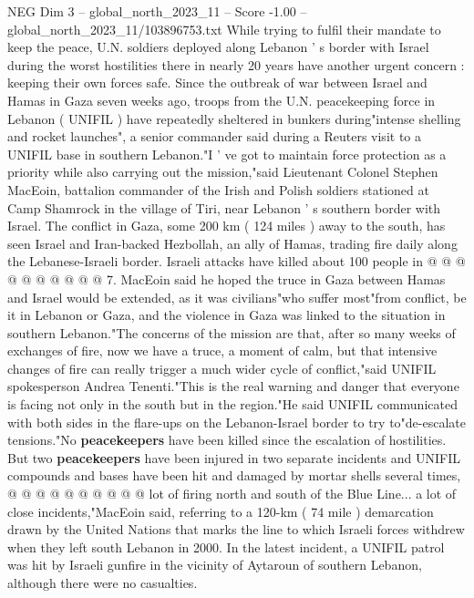 \begin{textsample}{NEG Dim 3 – global\_north\_2023\_11 – Score -1.00 – global\_north\_2023\_11/103896753.txt}  \label{ex:f3_neg_271}
While trying to fulfil their mandate to keep the peace, U.N. soldiers deployed along Lebanon ' s border with Israel during the worst hostilities there in nearly 20 years have another urgent concern : keeping their own forces safe.
Since the outbreak of war between Israel and Hamas in Gaza seven weeks ago, troops from the U.N. peacekeeping force in Lebanon ( UNIFIL ) have repeatedly sheltered in bunkers during"intense shelling and rocket launches", a senior commander said during a Reuters visit to a UNIFIL base in southern Lebanon."I ' ve got to maintain force protection as a priority while also carrying out the mission,"said Lieutenant Colonel Stephen MacEoin, battalion commander of the Irish and Polish soldiers stationed at Camp Shamrock in the village of Tiri, near Lebanon ' s southern border with Israel.
The conflict in Gaza, some 200 km ( 124 miles ) away to the south, has seen Israel and Iran-backed Hezbollah, an ally of Hamas, trading fire daily along the Lebanese-Israeli border.
Israeli attacks have killed about 100 people in @ @ @ @ @ @ @ @ @ @ 7.
MacEoin said he hoped the truce in Gaza between Hamas and Israel would be extended, as it was civilians"who suffer most"from conflict, be it in Lebanon or Gaza, and the violence in Gaza was linked to the situation in southern Lebanon."The concerns of the mission are that, after so many weeks of exchanges of fire, now we have a truce, a moment of calm, but that intensive changes of fire can really trigger a much wider cycle of conflict,"said UNIFIL spokesperson Andrea Tenenti."This is the real warning and danger that everyone is facing not only in the south but in the region."He said UNIFIL communicated with both sides in the flare-ups on the Lebanon-Israel border to try to"de-escalate tensions."No \textbf{peacekeepers} have been killed since the escalation of hostilities.
But two \textbf{peacekeepers} have been injured in two separate incidents and UNIFIL compounds and bases have been hit and damaged by mortar shells several times, @ @ @ @ @ @ @ @ @ @ lot of firing north and south of the Blue Line... a lot of close incidents,"MacEoin said, referring to a 120-km ( 74 mile ) demarcation drawn by the United Nations that marks the line to which Israeli forces withdrew when they left south Lebanon in 2000.
In the latest incident, a UNIFIL patrol was hit by Israeli gunfire in the vicinity of Aytaroun of southern Lebanon, although there were no casualties.

\end{textsample}
